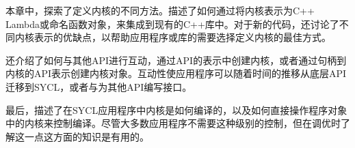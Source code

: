 
本章中，探索了定义内核的不同方法。描述了如何通过将内核表示为C++ Lambda或命名函数对象，来集成到现有的C++库中。对于新的代码，还讨论了不同内核表示的优缺点，以帮助应用程序或库的需要选择定义内核的最佳方式。\par

还介绍了如何与其他API进行互动，通过API的表示中创建内核，或者通过句柄到内核的API表示创建内核对象。互动性使应用程序可以随着时间的推移从底层API迁移到SYCL，或者与为其他API编写接口。\par

最后，描述了在SYCL应用程序中内核是如何编译的，以及如何直接操作程序对象中的内核来控制编译。尽管大多数应用程序不需要这种级别的控制，但在调优时了解这一点这方面的知识是有用的。\par


\newpage
